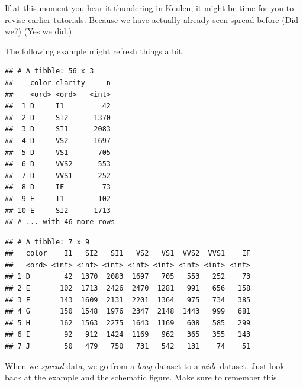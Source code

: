 \documentclass[]{tufte-book}
\newenvironment{Shaded}{}{}
\newcommand{\KeywordTok}[1]{\textcolor[rgb]{0.00,0.44,0.13}{\textbf{#1}}}
\newcommand{\NormalTok}[1]{#1}
\newcommand{\OperatorTok}[1]{\textcolor[rgb]{0.40,0.40,0.40}{#1}}
\newcommand{\StringTok}[1]{\textcolor[rgb]{0.25,0.44,0.63}{#1}}
\begin{document}
If at this moment you hear it thundering in Keulen, it might be time for you to revise earlier tutorials. Because we have actually already seen spread before (Did we?) (Yes we did.)

The following example might refresh things a bit.

\begin{Shaded}
\end{Shaded}

\begin{verbatim}
## # A tibble: 56 x 3
##    color clarity     n
##    <ord> <ord>   <int>
##  1 D     I1         42
##  2 D     SI2      1370
##  3 D     SI1      2083
##  4 D     VS2      1697
##  5 D     VS1       705
##  6 D     VVS2      553
##  7 D     VVS1      252
##  8 D     IF         73
##  9 E     I1        102
## 10 E     SI2      1713
## # ... with 46 more rows
\end{verbatim}

\begin{Shaded}
\end{Shaded}

\begin{verbatim}
## # A tibble: 7 x 9
##   color    I1   SI2   SI1   VS2   VS1  VVS2  VVS1    IF
##   <ord> <int> <int> <int> <int> <int> <int> <int> <int>
## 1 D        42  1370  2083  1697   705   553   252    73
## 2 E       102  1713  2426  2470  1281   991   656   158
## 3 F       143  1609  2131  2201  1364   975   734   385
## 4 G       150  1548  1976  2347  2148  1443   999   681
## 5 H       162  1563  2275  1643  1169   608   585   299
## 6 I        92   912  1424  1169   962   365   355   143
## 7 J        50   479   750   731   542   131    74    51
\end{verbatim}

When we \emph{spread} data, we go from a \emph{long} dataset to a \emph{wide} dataset. Just look back at the example and the schematic figure. Make sure to remember this.
\end{document}
